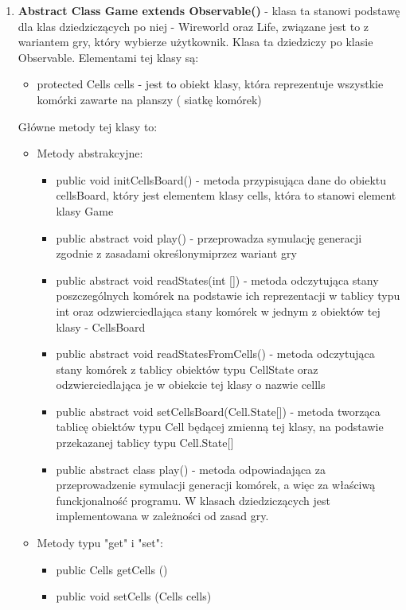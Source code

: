 \documentclass[10pt, oneside]{article}
\begin{document}
\begin{enumerate}
\item \textbf{Abstract Class Game extends Observable()} - klasa ta stanowi podstawę dla klas dziedziczących po niej - Wireworld oraz Life, związane jest to z wariantem gry, który wybierze 										użytkownik. Klasa ta dziedziczy po klasie Observable.
					Elementami tej klasy są:
	\begin {itemize}
	\item protected Cells cells - jest to obiekt klasy, która reprezentuje wszystkie komórki zawarte na planszy ( siatkę komórek)
	\end {itemize}


	Główne metody tej klasy to:
	\begin {itemize} \item Metody abstrakcyjne:
	\begin{itemize}
	\item public void initCellsBoard() - metoda przypisująca dane do obiektu cellsBoard, który jest elementem klasy cells, która to stanowi element klasy Game
	\item public abstract void play() - przeprowadza symulację generacji zgodnie z zasadami określonymiprzez wariant gry
	\item public abstract void  readStates(int []) - metoda odczytująca stany poszczególnych komórek na podstawie ich reprezentacji w tablicy typu int oraz odzwierciedlająca stany komórek w jednym z obiektów tej klasy - CellsBoard
	\item public abstract void readStatesFromCells() - metoda odczytująca stany komórek z tablicy obiektów typu CellState oraz odzwierciedlająca je w obiekcie tej klasy o nazwie  cellls
	\item public abstract void setCellsBoard(Cell.State[]) - metoda tworząca tablicę obiektów typu Cell będącej zmienną tej klasy, na podstawie przekazanej tablicy typu Cell.State[]
	\item public abstract class play() - metoda odpowiadająca za przeprowadzenie symulacji generacji komórek, a więc za właściwą funckjonalność programu. W klasach dziedziczących jest implementowana w zależności od zasad gry.
	\end {itemize}

	\item Metody typu "get" i "set":
	\begin{itemize}
	\item public  Cells getCells ()
	\item public  void setCells (Cells cells) 
	\end{itemize}
	\end{itemize}
	


\end{enumerate}
\end{document}
